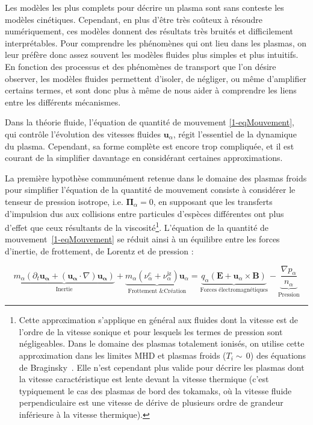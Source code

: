 \begin{refsection}
Les modèles les plus complets pour décrire un plasma sont sans
conteste les modèles cinétiques. Cependant, en plus d'être très coûteux à
résoudre numériquement, ces modèles donnent des résultats très bruités
et difficilement interprétables. Pour comprendre les phénomènes qui ont
lieu dans les plasmas, on leur préfère donc assez souvent les modèles fluides
plus simples et plus intuitifs.
En fonction des processus et des phénomènes de transport que l'on désire
observer, les modèles fluides permettent d'isoler, de négliger, ou même d'amplifier certains
termes, et sont donc plus à même de nous aider à comprendre les liens entre les
différents mécanismes.

Dans la théorie fluide, l'équation de quantité de
mouvement \eqref{1-eqMouvement}, qui contrôle l'évolution des vitesses fluides
$\mathbf u_\alpha$, régit l'essentiel de la dynamique du plasma. Cependant, sa forme complète
 est encore trop compliquée, et il est courant de la
simplifier davantage en considérant certaines approximations.

La première hypothèse communément retenue dans le domaine des
plasmas froids pour simplifier l'équation de la quantité de mouvement consiste à considérer le
tenseur de pression isotrope, i.e.
$\boldsymbol{\Pi}_\alpha=0$, en supposant que les transferts d'impulsion dus
aux collisions entre particules d'espèces différentes ont plus d'effet que
ceux résultants de la viscosité\footnote{Cette approximation s'applique en
général aux fluides dont la vitesse est de l'ordre de la vitesse sonique et
pour lesquels les termes de pression sont négligeables.
Dans le domaine des plasmas totalement ionisés, on utilise cette
approximation dans les limites MHD et plasmas froids ($T_i\sim\,$0) des
équations de Braginsky~\parencite{Fitzpatrick}. Elle n'est cependant plus valide
pour décrire les plasmas dont la vitesse caractéristique est lente devant la
vitesse thermique (c'est typiquement le cas des plasmas de bord des tokamaks,
où la vitesse fluide perpendiculaire est une vitesse de dérive de plusieurs
ordre de grandeur inférieure à la vitesse thermique).}.
L'équation de la quantité de mouvement~\eqref{1-eqMouvement} se réduit ainsi à un équilibre entre les forces
d'inertie, de frottement, de Lorentz et de pression :

\begin{equation}
\label{1-eqBilanForce}
\underbrace{m_\alpha \left(\partial_t \mathbf{u_\alpha} +
(\mathbf{u_\alpha}\cdot\nabla)\mathbf{u_\alpha}\right)}_\text{Inertie}
+\underbrace{m_\alpha\left(\nu_\alpha^c+
\nu_\alpha^\text{iz}\right)\mathbf
u_\alpha}_\text{Frottement \& Création}=\underbrace{{q_\alpha}\left(\mathbf
E+\mathbf u_\alpha\times \mathbf B\right)}_\text{Forces électromagnétiques}
-\underbrace{\frac{\nabla p_\alpha}{n_\alpha}}_\text{Pression}
\end{equation}
 

\end{refsection}
